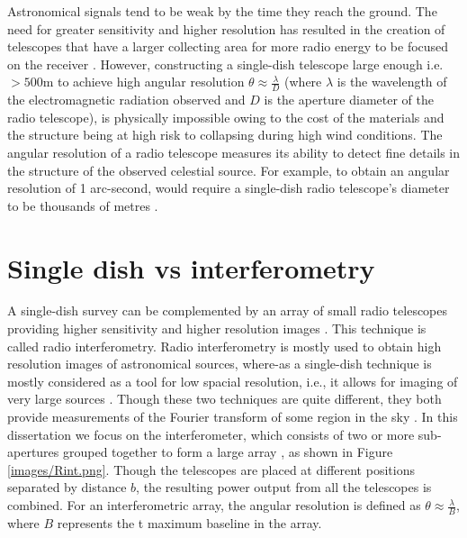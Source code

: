 Astronomical signals tend to be weak by the time they reach the ground. The need for greater sensitivity and higher resolution has resulted in the creation of telescopes that have a larger collecting area for more radio energy to be focused on the receiver \citep{verschuur2015invisible}. However, constructing a single-dish telescope large enough i.e. $>500\mathrm{m}$ to achieve high angular resolution $\theta \approx\frac{\lambda}{D}$ (where $\lambda$ is the wavelength of the electromagnetic radiation observed and $D$ is the aperture diameter of the radio telescope), is physically impossible owing to the cost of the materials and the structure being at high risk to collapsing during high wind conditions. The angular resolution of a radio telescope measures its ability to detect fine details in the structure of the observed celestial source. For example, to obtain an angular resolution of 1 arc-second, would require a single-dish radio telescope's diameter to be thousands of metres \citep{verschuur2015invisible}. 

\section{Single dish vs interferometry}
\label{RvI}


A single-dish survey can be complemented by an array of small radio telescopes providing higher sensitivity and higher resolution images  \citep{thompson2001interferometry}. This technique is called radio interferometry. Radio interferometry is mostly used to obtain high resolution images of astronomical sources, where-as a single-dish technique is mostly considered as a tool for low spacial resolution, i.e., it allows for imaging of very large sources \citep{thompson2001interferometry}. Though these two techniques are quite different, they both provide measurements of the Fourier transform of  some region in the sky \citep{cornwell1988radio}. In this dissertation we focus on the interferometer, which consists of two or more sub-apertures grouped together to form a large array \citep{verschuur2015invisible}, as shown in Figure \ref{images/Rint.png}. Though the telescopes are placed at different positions separated by distance $b$, the resulting power output from all the telescopes is combined. For an interferometric array, the angular resolution is defined as  $\theta \approx\frac{\lambda}{B}$, where $B$ represents the t maximum baseline in the array. 

